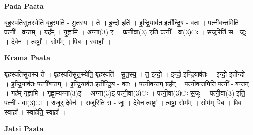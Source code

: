 \documentclass[17pt]{extarticle}
\begin{document}
\textbf{Pada Paata} \newline

बृह॒स्पति॑सुत॒स्येति॒ बृह॒स्पति॑ - सु॒त॒स्य॒ । ते॒ । इ॒न्दो॒ इति॑ । इ॒न्द्रि॒याव॑त॒ इती᳚न्द्रि॒य - व॒तः॒ । पत्नी॑वन्त॒मिति॒ पत्नी᳚ - व॒न्त॒म् । ग्रह᳚म् । गृ॒ह्णा॒मि॒ । अग्ना(3) इ । पत्नी॒वा(3) इति॒ पत्नी᳚ - वा(3)ः । स॒जूरिति॑ स - जूः । दे॒वेन॑ । त्वष्ट्रा᳚ । सोम᳚म् । पि॒ब॒ । स्वाहा᳚ ॥  \newline


\textbf{Krama Paata} \newline

बृह॒स्पति॑सुतस्य ते । बृह॒स्पति॑सुत॒स्येति॒ बृह॒स्पति॑ - सु॒त॒स्य॒ । त॒ इ॒न्दो॒ । इ॒न्दो॒ इ॒न्द्रि॒याव॑तः । इ॒न्दो॒ इती᳚न्दो । इ॒न्द्रि॒याव॑तः॒ पत्नी॑वन्तम् । इ॒न्द्रि॒याव॑त॒ इती᳚न्द्रि॒य - व॒तः॒ । पत्नी॑वन्त॒म् ग्रह᳚म् । पत्नी॑वन्त॒मिति॒ पत्नी᳚ - व॒न्त॒म् । गह॑म् गृह्णामि । गृ॒ह्णा॒म्यग्ना(3)इ । अग्ना(3)इ पत्नी॒वा(3)ः । पत्नी॒वा(3)ः स॒जूः । पत्नी॒वा(3) इति॒ पत्नी᳚ - वा(3)ः । स॒जूर् दे॒वेन॑ । स॒जूरिति॑ स - जूः । दे॒वेन॒ त्वष्ट्रा᳚ । त्वष्ट्रा॒ सोम᳚म् । सोम॑म् पिब । पि॒ब॒ स्वाहा᳚ । स्वाहेति॒ स्वाहा᳚ । \newline

\textbf{Jatai Paata} \newline
\end{document}
